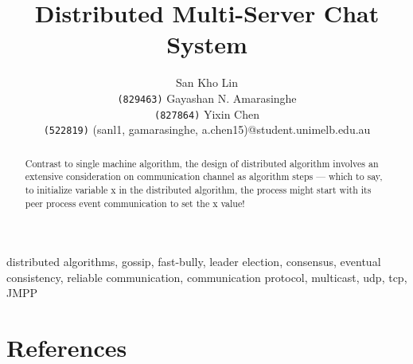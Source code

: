 \documentclass[11pt]{article}
\title{Distributed Multi-Server Chat System}
\author{San Kho Lin \\ \texttt{(829463)} \And
Gayashan N. Amarasinghe \\ \texttt{(827864)} \And
Yixin Chen \\ \texttt{(522819)} \AND
(sanl1, gamarasinghe, a.chen15)@student.unimelb.edu.au}
\begin{document}
\maketitle



\begin{abstract}
Contrast to single machine algorithm, the design of distributed algorithm involves an extensive consideration on communication channel as algorithm steps --- which to say, to initialize variable x in the distributed algorithm, the process might start with its peer process event communication to set the x value!
\end{abstract}

\begin{keywords} 
distributed algorithms, gossip, fast-bully, leader election, consensus, eventual consistency, reliable communication, communication protocol, multicast, udp, tcp, JMPP
\end{keywords}












\newpage

%




\newpage

\section{References}

\printbibliography[nottype=online,heading=subbibliography,title={Paper and Printed Sources}]
\printbibliography[type=online,heading=subbibliography,title={Online Sources}]



%
\end{document}
